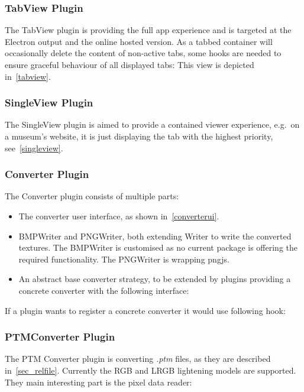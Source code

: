 \subsubsection{TabView Plugin}
The TabView plugin is providing the full app experience and is targeted at the
Electron output and the online hosted version. As a tabbed container will
occasionally delete the content of non-active tabs, some hooks are needed to
ensure graceful behaviour of all displayed tabs:
This view is depicted in~\autoref{tabview}.

\subsubsection{SingleView Plugin}
The SingleView plugin is aimed to provide a contained viewer experience, e.g.\ on
a museum's website, it is just displaying the tab with the highest priority, see~\autoref{singleview}.

\subsubsection{Converter Plugin}
The Converter plugin consists of multiple parts:
\begin{itemize}
\item The converter user interface, as shown in~\autoref{converterui}.
\item BMPWriter and PNGWriter, both extending Writer to write the converted
  textures. The BMPWriter is customised as no current package is offering the
  required functionality. The PNGWriter is wrapping pngjs.
\item An abstract base converter strategy, to be extended by plugins providing a
  concrete converter with the following interface:
\end{itemize}
If a plugin wants to register a concrete converter it would use following hook:

\subsubsection{PTMConverter Plugin}\label{sec_ptmconverter}
The PTM Converter plugin is converting \emph{.ptm} files, as they are described
in~\autoref{sec_relfile}. Currently the RGB and LRGB lightening models are
supported. They main interesting part is the pixel data reader:

